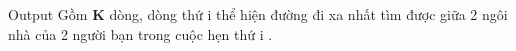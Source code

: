 Output
Gồm \textbf{ K } dòng, dòng thứ i thể hiện đường đi xa nhất tìm được giữa 2 ngôi nhà của 2 người bạn trong cuộc hẹn thứ i .